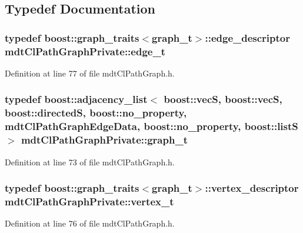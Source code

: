 \subsection{Typedef Documentation}
\hypertarget{namespacemdt_cl_path_graph_private_a96eb891b98d89bbea2f573cd8f3accd2}{
\subsubsection[{edge\-\_\-t}]{\setlength{\rightskip}{0pt plus 5cm}typedef boost\-::graph\-\_\-traits$<${\bf graph\-\_\-t}$>$\-::edge\-\_\-descriptor {\bf mdt\-Cl\-Path\-Graph\-Private\-::edge\-\_\-t}}}\label{namespacemdt_cl_path_graph_private_a96eb891b98d89bbea2f573cd8f3accd2}


Definition at line 77 of file mdt\-Cl\-Path\-Graph.\-h.

\hypertarget{namespacemdt_cl_path_graph_private_a9a28712932316ef1dd4caf737a6d7e07}{
\subsubsection[{graph\-\_\-t}]{\setlength{\rightskip}{0pt plus 5cm}typedef boost\-::adjacency\-\_\-list$<$ boost\-::vec\-S, boost\-::vec\-S, boost\-::directed\-S, boost\-::no\-\_\-property, {\bf mdt\-Cl\-Path\-Graph\-Edge\-Data}, boost\-::no\-\_\-property, boost\-::list\-S $>$ {\bf mdt\-Cl\-Path\-Graph\-Private\-::graph\-\_\-t}}}\label{namespacemdt_cl_path_graph_private_a9a28712932316ef1dd4caf737a6d7e07}


Definition at line 73 of file mdt\-Cl\-Path\-Graph.\-h.

\hypertarget{namespacemdt_cl_path_graph_private_a0aaa28f25df9a7fcd4602cc15b3b3795}{
\subsubsection[{vertex\-\_\-t}]{\setlength{\rightskip}{0pt plus 5cm}typedef boost\-::graph\-\_\-traits$<${\bf graph\-\_\-t}$>$\-::vertex\-\_\-descriptor {\bf mdt\-Cl\-Path\-Graph\-Private\-::vertex\-\_\-t}}}\label{namespacemdt_cl_path_graph_private_a0aaa28f25df9a7fcd4602cc15b3b3795}


Definition at line 76 of file mdt\-Cl\-Path\-Graph.\-h.

